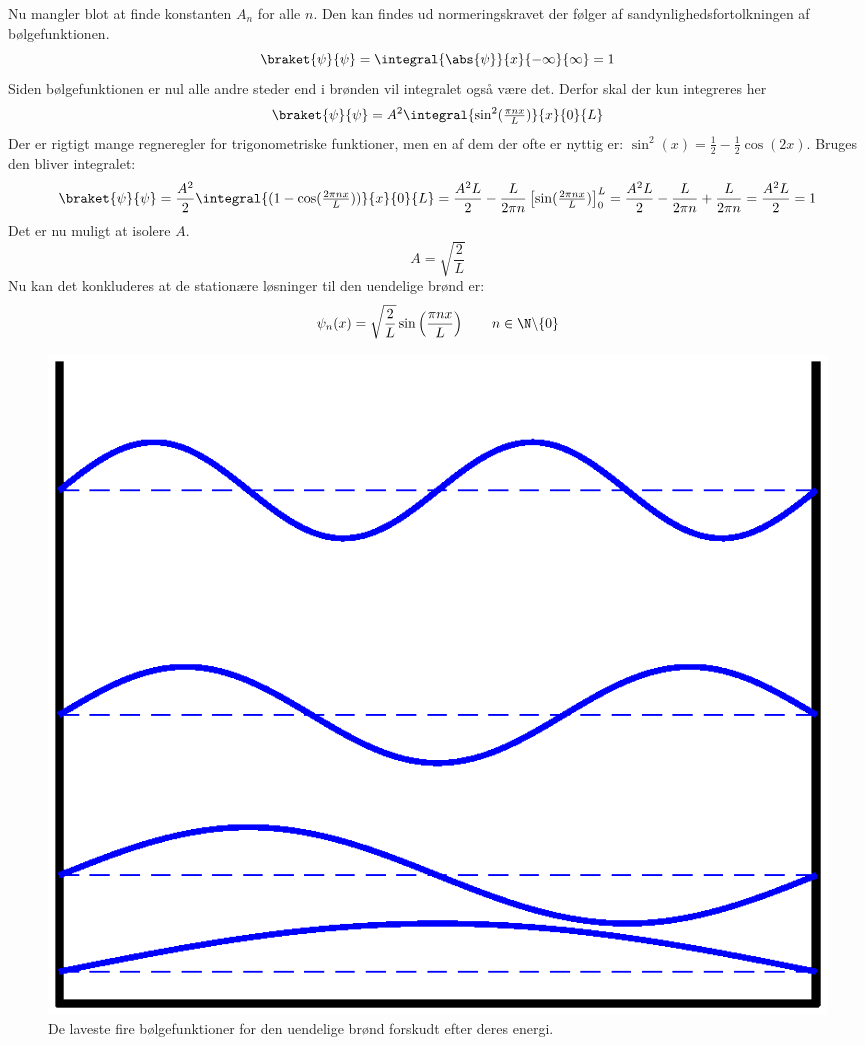 Nu mangler blot at finde konstanten $A_n$ for alle $n$. Den kan findes ud normeringskravet der følger af sandynlighedsfortolkningen af bølgefunktionen.
$$
\braket{\psi}{\psi} = \integral{\abs{\psi}}{x}{-\infty}{\infty} = 1
$$ 
Siden bølgefunktionen er nul alle andre steder end i brønden vil integralet også være det. Derfor skal der kun integreres her
$$
\braket{\psi}{\psi} = A^2\integral{\sin^2(\tfrac{\pi n x}{L})}{x}{0}{L} 
$$
Der er rigtigt mange regneregler for trigonometriske funktioner, men en af dem der ofte er nyttig er: $\sin^2(x) =\frac{1}{2}-\frac{1}{2}\cos(2x)$. Bruges den bliver integralet:
$$
\braket{\psi}{\psi} = \frac{A^2}{2}\integral{(1-\cos(\tfrac{2\pi n x}{L}))}{x}{0}{L} = \frac{A^2L}{2}-\frac{L}{2\pi n}\left[\sin(\tfrac{2\pi nx}{L})\right]_0^L = \frac{A^2L}{2}-\frac{L}{2\pi n}+\frac{L}{2\pi n} = \frac{A^2L}{2} = 1
$$
Det er nu muligt at isolere $A$.
$$
A=\sqrt{\frac{2}{L}}
$$
Nu kan det konkluderes at de stationære løsninger til den uendelige brønd er:
\begin{equation}
\psi_n(x) = \sqrt{\frac{2}{L}}\sin\left(\frac{\pi nx}{L}\right)~~~~~~n\in \N\backslash\{0\}
\end{equation}
\begin{figure}
\center
\includegraphics[width = 0.75 \textwidth]{Kvantemekanik/billeder/infwellwave.eps}
\caption{De laveste fire bølgefunktioner for den uendelige brønd forskudt efter deres energi.}
\end{figure}